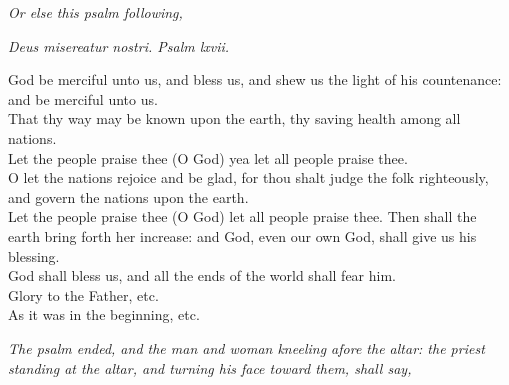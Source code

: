 \documentclass[
]{book}
\begin{document}
\begin{center}
\emph{Or else this psalm following,}

\end{center}

\emph{Deus misereatur nostri. Psalm lxvii.}

God be merciful unto us, and bless us, and shew us the light of his countenance: and be merciful unto us.\\
That thy way may be known upon the earth, thy saving health among all nations.\\
Let the people praise thee (O God) yea let all people praise thee.\\
O let the nations rejoice and be glad, for thou shalt judge the folk righteously, and govern the nations upon the earth.\\
Let the people praise thee (O God) let all people praise thee. Then shall the earth bring forth her increase: and God, even our own God, shall give us his blessing.\\
God shall bless us, and all the ends of the world shall fear him.\\
Glory to the Father, etc.\\
As it was in the beginning, etc.

\begin{center}
\emph{The psalm ended, and the man and woman kneeling afore the altar: the priest standing at the altar, and turning his face toward them, shall say,}

\end{center}
\end{document}
